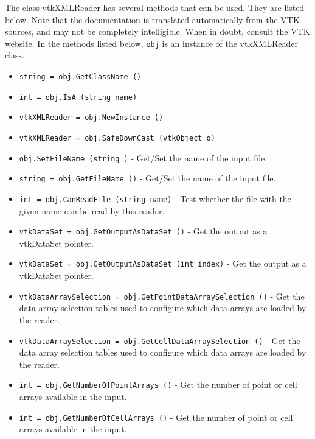 The class vtkXMLReader has several methods that can be used.
  They are listed below.
Note that the documentation is translated automatically from the VTK sources,
and may not be completely intelligible.  When in doubt, consult the VTK website.
In the methods listed below, \verb|obj| is an instance of the vtkXMLReader class.
\begin{itemize}
\item  \verb|string = obj.GetClassName ()|

\item  \verb|int = obj.IsA (string name)|

\item  \verb|vtkXMLReader = obj.NewInstance ()|

\item  \verb|vtkXMLReader = obj.SafeDownCast (vtkObject o)|

\item  \verb|obj.SetFileName (string )| -  Get/Set the name of the input file.

\item  \verb|string = obj.GetFileName ()| -  Get/Set the name of the input file.

\item  \verb|int = obj.CanReadFile (string name)| -  Test whether the file with the given name can be read by this
 reader.

\item  \verb|vtkDataSet = obj.GetOutputAsDataSet ()| -  Get the output as a vtkDataSet pointer.

\item  \verb|vtkDataSet = obj.GetOutputAsDataSet (int index)| -  Get the output as a vtkDataSet pointer.

\item  \verb|vtkDataArraySelection = obj.GetPointDataArraySelection ()| -  Get the data array selection tables used to configure which data
 arrays are loaded by the reader.

\item  \verb|vtkDataArraySelection = obj.GetCellDataArraySelection ()| -  Get the data array selection tables used to configure which data
 arrays are loaded by the reader.

\item  \verb|int = obj.GetNumberOfPointArrays ()| -  Get the number of point or cell arrays available in the input.

\item  \verb|int = obj.GetNumberOfCellArrays ()| -  Get the number of point or cell arrays available in the input.


\end{itemize}
